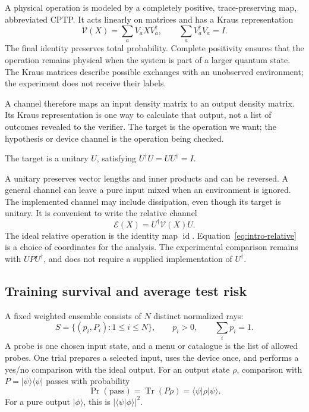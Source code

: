 \documentclass[11pt,a4paper]{article}
\newcommand{\ket}[1]{\lvert #1\rangle}
\newcommand{\bra}[1]{\langle #1\rvert}
\newcommand{\Tr}{\operatorname{Tr}}
\newcommand{\id}{\operatorname{id}}
\numberwithin{equation}{section}
\begin{document}
A physical operation is modeled by a completely positive, trace-preserving map, abbreviated CPTP. It acts linearly on matrices and has a Kraus representation
\begin{equation}
 \mathcal V(X)=\sum_a V_aXV_a^\dagger,
 \qquad \sum_a V_a^\dagger V_a=I.
 \label{eq:intro-kraus}
\end{equation}
The final identity preserves total probability. Complete positivity ensures that the operation remains physical when the system is part of a larger quantum state. The Kraus matrices describe possible exchanges with an unobserved environment; the experiment does not receive their labels.

A channel therefore maps an input density matrix to an output density
matrix. Its Kraus representation is one way to calculate that output, not
a list of outcomes revealed to the verifier. The target is the operation
we want; the hypothesis or device channel is the operation being checked.

The target is a unitary $U$, satisfying $U^\dagger U=UU^\dagger=I$.

A unitary preserves vector lengths and inner products and can be reversed.
A general channel can leave a pure input mixed when an environment is ignored. The implemented channel may include dissipation, even though its target is unitary. It is convenient to write the relative channel
\begin{equation}
 \mathcal E(X)=U^\dagger\mathcal V(X)U.
 \label{eq:intro-relative}
\end{equation}
The ideal relative operation is the identity map $\id$. Equation~\eqref{eq:intro-relative} is a choice of coordinates for the analysis. The experimental comparison remains with $UPU^\dagger$, and does not require a supplied implementation of $U^\dagger$.

\subsection{Training survival and average test risk}

A fixed weighted ensemble consists of $N$ distinct normalized rays:
\begin{equation}
 S=\{(p_i,P_i):1\le i\le N\},
 \qquad p_i>0,\qquad \sum_i p_i=1.
 \label{eq:intro-ensemble}
\end{equation}
A probe is one chosen input state, and a menu or catalogue is the list
of allowed probes. One trial prepares a selected input, uses the device once,
and performs a yes/no comparison with the ideal output. For an output
state $\rho$, comparison with $P=\ket\psi\bra\psi$ passes with probability
\[
 \Pr(\mathrm{pass})=\Tr(P\rho)=\bra\psi\rho\ket\psi.
\]
For a pure output $\ket\phi$, this is $|\langle\psi|\phi\rangle|^2$.
\end{document}
